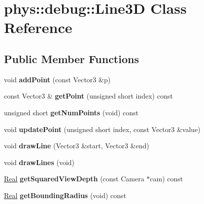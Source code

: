 \hypertarget{classphys_1_1debug_1_1Line3D}{
\section{phys::debug::Line3D Class Reference}
\label{d6/d1b/classphys_1_1debug_1_1Line3D}
}
\subsection*{Public Member Functions}
\begin{DoxyCompactItemize}
\item 
\hypertarget{classphys_1_1debug_1_1Line3D_a449ea187f5bbf16f73f4d8dc7977addb}{
void {\bfseries addPoint} (const Vector3 \&p)}
\label{d6/d1b/classphys_1_1debug_1_1Line3D_a449ea187f5bbf16f73f4d8dc7977addb}

\item 
\hypertarget{classphys_1_1debug_1_1Line3D_a7c275f3f7c48d7a7ad807bd419547d45}{
const Vector3 \& {\bfseries getPoint} (unsigned short index) const }
\label{d6/d1b/classphys_1_1debug_1_1Line3D_a7c275f3f7c48d7a7ad807bd419547d45}

\item 
\hypertarget{classphys_1_1debug_1_1Line3D_ad10a08d99077ac3ac5c68e3b1c121805}{
unsigned short {\bfseries getNumPoints} (void) const }
\label{d6/d1b/classphys_1_1debug_1_1Line3D_ad10a08d99077ac3ac5c68e3b1c121805}

\item 
\hypertarget{classphys_1_1debug_1_1Line3D_a9f12d620c63df9bbffbd68d3a73317a1}{
void {\bfseries updatePoint} (unsigned short index, const Vector3 \&value)}
\label{d6/d1b/classphys_1_1debug_1_1Line3D_a9f12d620c63df9bbffbd68d3a73317a1}

\item 
\hypertarget{classphys_1_1debug_1_1Line3D_ad0d6ed90fbbff7e9d568c2c773a202f3}{
void {\bfseries drawLine} (Vector3 \&start, Vector3 \&end)}
\label{d6/d1b/classphys_1_1debug_1_1Line3D_ad0d6ed90fbbff7e9d568c2c773a202f3}

\item 
\hypertarget{classphys_1_1debug_1_1Line3D_afb66ce45cef0dfca3f79056b5bf36318}{
void {\bfseries drawLines} (void)}
\label{d6/d1b/classphys_1_1debug_1_1Line3D_afb66ce45cef0dfca3f79056b5bf36318}

\item 
\hypertarget{classphys_1_1debug_1_1Line3D_ae8ad277bea57629e860acce0d14a0643}{
\hyperlink{namespacephys_af7eb897198d265b8e868f45240230d5f}{Real} {\bfseries getSquaredViewDepth} (const Camera $\ast$cam) const }
\label{d6/d1b/classphys_1_1debug_1_1Line3D_ae8ad277bea57629e860acce0d14a0643}

\item 
\hypertarget{classphys_1_1debug_1_1Line3D_ad67db03f607f3544c1f3726d0c160bbb}{
\hyperlink{namespacephys_af7eb897198d265b8e868f45240230d5f}{Real} {\bfseries getBoundingRadius} (void) const }
\label{d6/d1b/classphys_1_1debug_1_1Line3D_ad67db03f607f3544c1f3726d0c160bbb}

\end{DoxyCompactItemize}
